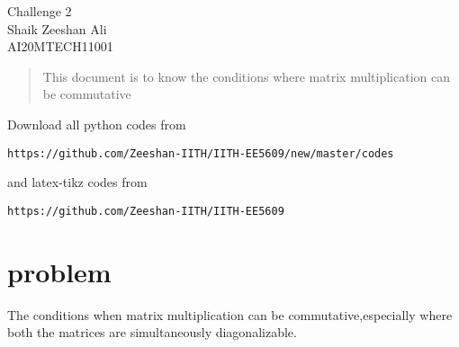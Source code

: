 \documentclass[journal,12pt,twocolumn]{IEEEtran}
\begin{document}
    \begin{center}
    \huge Challenge 2\\
    \large Shaik Zeeshan Ali\\
    \large AI20MTECH11001\\
    \end{center}
\vspace{0.5cm}
\begin{abstract}
This document is to know the conditions where matrix multiplication can be commutative
\end{abstract}
\vspace{0.5cm}
Download all python codes from 
\begin{lstlisting}
https://github.com/Zeeshan-IITH/IITH-EE5609/new/master/codes
\end{lstlisting}
%
and latex-tikz codes from 
\begin{lstlisting}
https://github.com/Zeeshan-IITH/IITH-EE5609
\end{lstlisting}
%
\section{problem}
The conditions when matrix multiplication can be commutative,especially where both the matrices are simultaneously diagonalizable.
\end{document}
